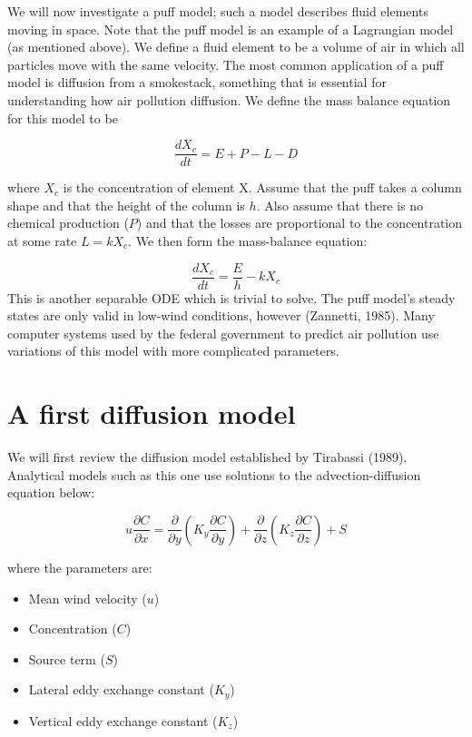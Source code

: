 \documentclass{article}
\begin{document}
We will now investigate a puff model; such a model describes fluid elements moving in space. Note that the puff model
is an example of a Lagrangian model (as mentioned above). We define a fluid element
to be a volume of air in which all particles move with the same velocity. The most common application of a puff model is diffusion from a 
smokestack, something that is essential for understanding how air pollution diffusion. We define the mass balance equation for this model
to be 

\begin{equation}
    \frac{dX_{c}}{dt} = E + P - L - D
\end{equation}

where $X_{c}$ is the concentration of element X. Assume that the puff takes a column shape and that the height of the column is $h$.
Also assume that there is no chemical production ($P$) and that the losses are proportional to the concentration at some rate $L = kX_{c}$. 
We then form the mass-balance equation:

\begin{equation}
    \frac{dX_{c}}{dt} = \frac{E}{h} - kX_{c}
\end{equation}
This is another separable ODE which is trivial to solve. The puff model's steady states are only valid in low-wind conditions, however (Zannetti, 1985).
Many computer systems used by the federal government to predict air pollution use variations of this model with more complicated parameters.

\section{A first diffusion model}

We will first review the diffusion model established by Tirabassi (1989). Analytical models such as this one use solutions to the 
advection-diffusion equation below:

\begin{equation}
    u\frac{\partial C}{\partial x} = \frac{\partial}{\partial y} (K_y \frac{\partial C}{\partial y}) + \frac{\partial}{\partial z} (K_z \frac{\partial C}{\partial z}) + S
\end{equation}

where the parameters are:

\begin{itemize}
    \item Mean wind velocity ($u$)
    \item Concentration ($C$)
    \item Source term ($S$)
    \item Lateral eddy exchange constant ($K_y$)
    \item Vertical eddy exchange constant ($K_z$)
 \end{itemize}
 
\end{document}
